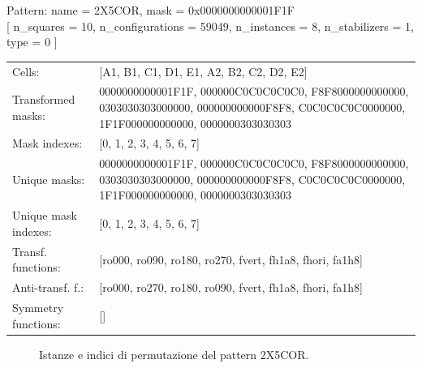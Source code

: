\begin{tcolorbox}[sharp corners, fontupper=\ttfamily\small, colback=white]
  \noindent Pattern: name = 2X5COR, mask = 0x0000000000001F1F\\
  {[} n\_squares = 10, n\_configurations = 59049,
  n\_instances = 8, n\_stabilizers = 1, type = 0 { ]}\\[1.0ex]
  \begin{tabularx}{\textwidth}{@{} p{3.5cm} X @{}}
    Cells:               & {[}A1, B1, C1, D1, E1, A2, B2, C2, D2, E2{]}\\[0.5ex]
    Transformed masks:   & 0000000000001F1F, 000000C0C0C0C0C0, F8F8000000000000, 0303030303000000, 000000000000F8F8, C0C0C0C0C0000000, 1F1F000000000000, 0000000303030303\\[0.5ex]
    Mask indexes:        & {[}0, 1, 2, 3, 4, 5, 6, 7{]}\\[0.5ex]
    Unique masks:        & 0000000000001F1F, 000000C0C0C0C0C0, F8F8000000000000, 0303030303000000, 000000000000F8F8, C0C0C0C0C0000000, 1F1F000000000000, 0000000303030303\\[0.5ex]
    Unique mask indexes: & {[}0, 1, 2, 3, 4, 5, 6, 7{]}\\[0.5ex]
    Transf. functions:   & {[}ro000, ro090, ro180, ro270, fvert, fh1a8, fhori, fa1h8{]}\\[0.5ex]
    Anti-transf. f.:     & {[}ro000, ro270, ro180, ro090, fvert, fh1a8, fhori, fa1h8{]}\\[0.5ex]
    Symmetry functions:  & {[}{]}\\[0.5ex]
  \end{tabularx}
\end{tcolorbox}

\begin{figure}[htbp]
  \centering
   \hfill
   \hfill
   \hfill
  \vspace{0.3cm}
   \hfill
   \hfill
   \hfill
  \caption{Istanze e indici di permutazione del pattern 2X5COR.}
\end{figure}

